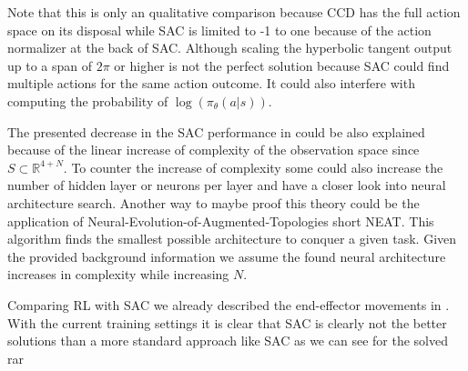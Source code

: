 Note that this is only an qualitative comparison because CCD has the full action space on its disposal while SAC is limited to -1 to one because of the action normalizer at the back of SAC. Although scaling the hyperbolic tangent output up to a span of $2\pi$ or higher is not the perfect solution because SAC could find multiple actions for the same action outcome. It could also interfere with computing the probability of $\log(\pi_\theta(a|s))$.

The presented decrease in the SAC performance in  could be also explained because of the linear increase of complexity of the observation space since $S \subset \mathbb{R}^{4+N}$. To counter the increase of complexity some could also increase the number of hidden layer or neurons per layer and have a closer look into neural architecture search. Another way to maybe proof this theory could be the application of Neural-Evolution-of-Augmented-Topologies short NEAT. This algorithm finds the smallest possible architecture to conquer a given task. Given the provided background information we assume the found neural architecture increases in complexity while increasing $N$.

Comparing RL with SAC we already described the end-effector movements in . With the current training settings it is clear that SAC is clearly not the better solutions than a more standard approach like SAC as we can see for the solved rar

